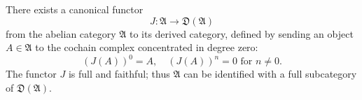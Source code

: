 There exists a canonical functor
$$
J: \mathfrak{A} \longrightarrow \mathfrak{D}(\mathfrak{A})
$$
from the abelian category $\mathfrak{A}$ to its derived category, defined by sending an object $A \in \mathfrak{A}$ to the cochain complex concentrated in degree zero:
$$
(J(A))^0 = A, \quad (J(A))^n = 0 \text{ for } n \neq 0.
$$
The functor $J$ is full and faithful; thus $\mathfrak{A}$ can be identified with a full subcategory of $\mathfrak{D}(\mathfrak{A})$.
